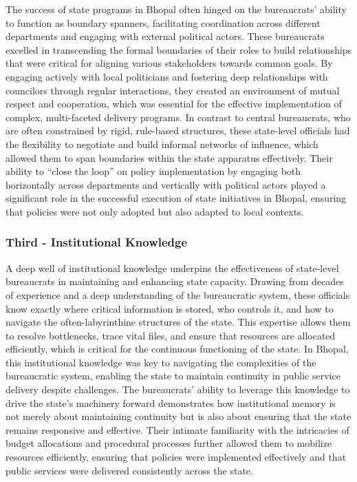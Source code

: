 The success of state programs in Bhopal often hinged on the bureaucrats' ability to function as boundary spanners, facilitating coordination across different departments and engaging with external political actors. These bureaucrats excelled in transcending the formal boundaries of their roles to build relationships that were critical for aligning various stakeholders towards common goals. By engaging actively with local politicians and fostering deep relationships with councilors through regular interactions, they created an environment of mutual respect and cooperation, which was essential for the effective implementation of complex, multi-faceted delivery programs. In contrast to central bureaucrats, who are often constrained by rigid, rule-based structures, these state-level officials had the flexibility to negotiate and build informal networks of influence, which allowed them to span boundaries within the state apparatus effectively. Their ability to ``close the loop'' on policy implementation by engaging both horizontally across departments and vertically with political actors played a significant role in the successful execution of state initiatives in Bhopal, ensuring that policies were not only adopted but also adapted to local contexts.

\subsubsection{Third - Institutional Knowledge}

A deep well of institutional knowledge underpins the effectiveness of state-level bureaucrats in maintaining and enhancing state capacity. Drawing from decades of experience and a deep understanding of the bureaucratic system, these officials know exactly where critical information is stored, who controls it, and how to navigate the often-labyrinthine structures of the state. This expertise allows them to resolve bottlenecks, trace vital files, and ensure that resources are allocated efficiently, which is critical for the continuous functioning of the state. In Bhopal, this institutional knowledge was key to navigating the complexities of the bureaucratic system, enabling the state to maintain continuity in public service delivery despite challenges. The bureaucrats' ability to leverage this knowledge to drive the state's machinery forward demonstrates how institutional memory is not merely about maintaining continuity but is also about ensuring that the state remains responsive and effective. Their intimate familiarity with the intricacies of budget allocations and procedural processes further allowed them to mobilize resources efficiently, ensuring that policies were implemented effectively and that public services were delivered consistently across the state.

